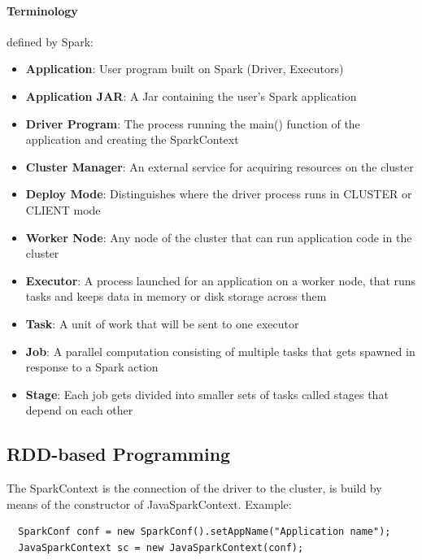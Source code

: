 \documentclass[12pt]{article}
\begin{document}
\paragraph{Terminology} defined by Spark:
\begin{itemize}
  \item \textbf{Application}: User program built on Spark (Driver, Executors)
  \item \textbf{Application JAR}: A Jar containing the user's Spark application
  \item \textbf{Driver Program}: The process running the main() function of the application and creating the SparkContext
  \item \textbf{Cluster Manager}: An external service for acquiring resources on the cluster
  \item \textbf{Deploy Mode}: Distinguishes where the driver process runs in CLUSTER or CLIENT mode
  \item \textbf{Worker Node}: Any node of the cluster that can run application code in the cluster
  \item \textbf{Executor}: A process launched for an application on a worker node, that runs tasks and keeps data in memory or disk storage across them
  \item \textbf{Task}: A unit of work that will be sent to one executor
  \item \textbf{Job}: A parallel computation consisting of multiple tasks that gets spawned in response to a Spark action
  \item \textbf{Stage}: Each job gets divided into smaller sets of tasks called stages that depend on each other
\end{itemize}

\subsection{RDD-based Programming}
The SparkContext is the connection of the driver to the cluster, is build by means of the constructor of JavaSparkContext. Example:
\begin{lstlisting}
  SparkConf conf = new SparkConf().setAppName("Application name");
  JavaSparkContext sc = new JavaSparkContext(conf);
\end{lstlisting}
\end{document}
